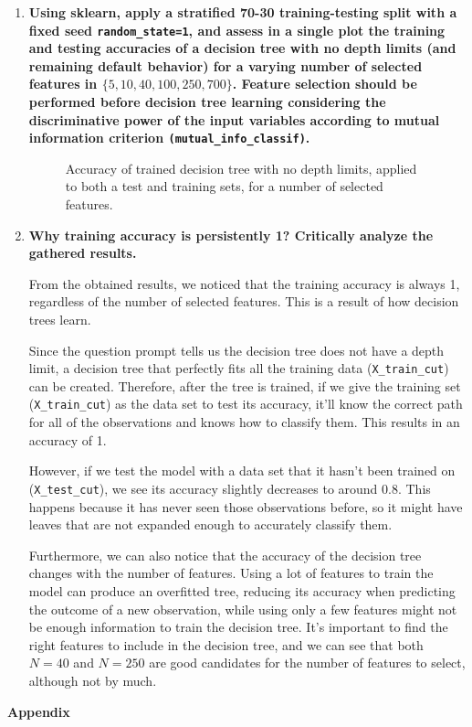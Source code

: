 \documentclass[12pt]{article}
\begin{document}
\begin{enumerate}[leftmargin=\labelsep]
    \item {\bfseries Using sklearn, apply a stratified 70-30 training-testing split with a fixed seed
          \texttt{random\_state=1}, and assess in a single plot the training and testing accuracies of
          a decision tree with no depth limits (and remaining default behavior) for a varying number
          of selected features in \(\{5,10,40,100,250,700\}\).
          Feature selection should be performed before decision tree learning considering the
          discriminative power of the input variables according to mutual information criterion
          \texttt{(mutual\_info\_classif)}.
          }

          \begin{figure}[H]
              \centering
              
              \caption{Accuracy of trained decision tree with no depth limits, applied to both a test and training sets, for a number of selected features.}
              \label{fig:ex1-plot}
          \end{figure}

    \item \textbf{Why training accuracy is persistently 1? Critically analyze the gathered results.}

          From the obtained results, we noticed that the training accuracy is always 1, regardless of the number of selected features.
          This is a result of how decision trees learn.

          Since the question prompt tells us the decision tree does not have a depth limit, a decision tree that perfectly fits all the training data (\texttt{X\_train_cut}) can be created.
          Therefore, after the tree is trained, if we give the training set (\texttt{X\_train_cut}) as the data set to test its accuracy, it'll know the correct path for all of the observations and knows how to classify them.
          This results in an accuracy of 1.

          However, if we test the model with a data set that it hasn't been trained on (\texttt{X\_test_cut}), we see its accuracy slightly decreases to around 0.8.
          This happens because it has never seen those observations before, so it might have leaves that are not expanded enough to accurately classify them.

          Furthermore, we can also notice that the accuracy of the decision tree changes with the number of features.
          Using a lot of features to train the model can produce an overfitted tree, reducing its accuracy when predicting the outcome of a new observation,
          while using only a few features might not be enough information to train the decision tree.
          It's important to find the right features to include in the decision tree, and we can see that both \(N = 40\) and \(N = 250\) are good candidates for the number of features to select, although not by much.
\end{enumerate}

\center\large{\textbf{Appendix}\vskip 0.3cm}


\end{document}
